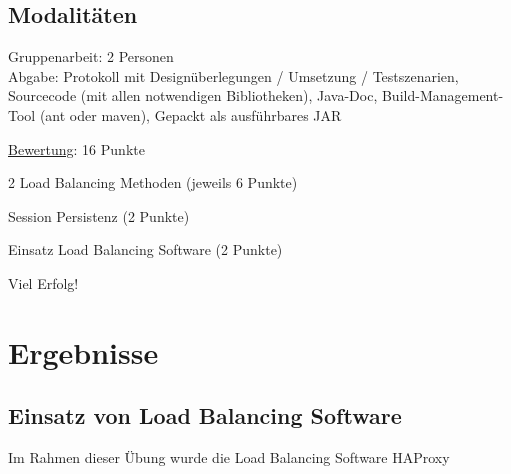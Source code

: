 \documentclass[letterpaper, 12pt]{article}
\let\tempsection\section
\renewcommand\section[1]{\vspace{-0.3cm}\tempsection{#1}\vspace{-0.3cm}}
\let\tempsubsection\subsection
\renewcommand\subsection[1]{\vspace{0cm}\tempsubsection{#1}\vspace{0cm}}
\begin{document}
\subsection{Modalitäten}
\label{sec:Modalitäten}
Gruppenarbeit: 2 Personen \\
Abgabe: Protokoll mit Designüberlegungen / Umsetzung / Testszenarien, Sourcecode (mit allen notwendigen Bibliotheken), Java-Doc, Build-Management-Tool (ant oder maven), Gepackt als ausführbares JAR

\clearpage

\uline{Bewertung}: 16 Punkte

\begin{list}{-}
\item 2 Load Balancing Methoden (jeweils 6 Punkte)
\item Session Persistenz (2 Punkte)
\item Einsatz Load Balancing Software (2 Punkte)
\end{list}

Viel Erfolg!

\clearpage

\section{Ergebnisse}
\label{sec:Ergebnisse}

\subsection{Einsatz von Load Balancing Software}
\label{sec:Einsatz von Load Balancing Software}
Im Rahmen dieser Übung wurde die Load Balancing Software HAProxy\cite{HAProxy}

\newpage



\lstlistoflistings
\listoffigures
\end{document}
